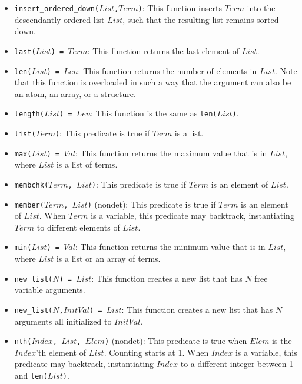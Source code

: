 \begin{itemize}
\item \texttt{insert\_ordered\_down($List$,$Term$)}: This function inserts $Term$ into the descendantly ordered list $List$, such that the resulting list remains sorted down.
\item \texttt{last($List$) = $Term$}: This function returns the last element of $List$. 
\item \texttt{len($List$) = $Len$}: This function returns the number of elements in $List$. Note that this function is overloaded in such a way that the argument can also be an atom, an array, or a structure.
\item \texttt{length($List$) = $Len$}: This function is the same as \texttt{len($List$)}.
\item \texttt{list($Term$)}: This predicate is true if $Term$ is a list.
\item \texttt{max($List$) = $Val$}: This function returns the maximum value that is in $List$, where $List$ is a list of terms. 
\item \texttt{membchk($Term$, $List$)}: This predicate is true if $Term$ is an element of $List$. 
\item \texttt{member($Term$, $List$)} (nondet): This predicate is true if $Term$ is an element of $List$.  When $Term$ is a variable, this predicate may backtrack, instantiating $Term$ to different elements of $List$.
\item \texttt{min($List$) = $Val$}: This function returns the minimum value that is in $List$, where $List$ is a list or an array of terms. 
\item \texttt{new\_list($N$) = $List$}: This function creates a new list that has $N$ free variable arguments. 
\item \texttt{new\_list($N$,$InitVal$) = $List$}: This function creates a new list that has $N$ arguments all initialized to $InitVal$. 

\item \texttt{nth($Index$, $List$, $Elem$)} (nondet): This predicate is true when $Elem$ is the $Index$'th element of $List$.  Counting starts at 1. When $Index$ is a variable, this predicate may backtrack, instantiating $Index$ to a different integer between 1 and \texttt{len($List$)}.


\end{itemize}
